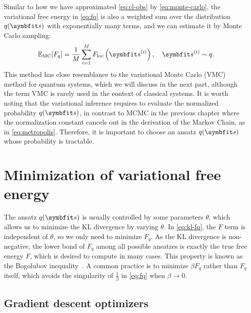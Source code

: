 Similar to how we have approximated \cref{eq:cl-obs} by \cref{eq:monte-carlo}, the variational free energy in \cref{eq:fq} is also a weighted sum over the distribution $q(\vs)$ with exponentially many terms, and we can estimate it by Monte Carlo sampling:
\begin{equation}
\bbE_\text{MC}[F_q] = \frac{1}{M} \sum_{i = 1}^M F_\text{loc}\left( \vs^{(i)} \right), \quad
\vs^{(i)} \sim q.
\label{eq:fq-monte-carlo}
\end{equation}
This method has close resemblance to the variational Monte Carlo (VMC) method for quantum systems, which we will discuss in the next part, although the term VMC is rarely used in the context of classical systems. It is worth noting that the variational inference requires to evaluate the normalized probability $q(\vs)$, in contrast to MCMC in the previous chapter where the normalization constant cancels out in the derivation of the Markov Chain, as in \cref{eq:metropolis}. Therefore, it is important to choose an ansatz $q(\vs)$ whose probability is tractable.

\section{Minimization of variational free energy}

The ansatz $q(\vs)$ is usually controlled by some parameters $\theta$, which allows us to minimize the KL divergence by varying $\theta$. In \cref{eq:kl-fq}, the $F$ term is independent of $\theta$, so we only need to minimize $F_q$. As the KL divergence is non-negative, the lower bond of $F_q$ among all possible ansatzes is exactly the true free energy $F$, which is desired to compute in many cases. This property is known as the Bogolubov inequality~\cite{bogolubov1966model}. A common practice is to minimize $\beta F_q$ rather than $F_q$ itself, which avoids the singularity of $\frac{1}{\beta}$ in \cref{eq:fq} when $\beta \to 0$.

\subsection{Gradient descent optimizers}
\label{sec:gd}

